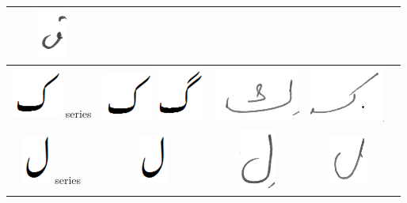\documentclass[a4paper,conference]{IEEEtran}
\begin{document}
\begin{table}[h]
\begin{tabular}{@{}ccccc@{}}
\includegraphics[scale=0.20]{25} & \\ 
\hline
\includegraphics[scale=0.20]{Kaaf_orig} series & \includegraphics[scale=0.20]{Kaaf_orig} \includegraphics[scale=0.20]{Gaaf_orig} &\includegraphics[scale=0.20]{26} &
\includegraphics[scale=0.20]{27} & \\ 
\hline
\includegraphics[scale=0.20]{laam_orig} series & \includegraphics[scale=0.25]{laam_orig} & \includegraphics[scale=0.25]{laam2} &
\includegraphics[scale=0.20]{28} & \\ 

\end{tabular}
\end{table}
\end{document}
